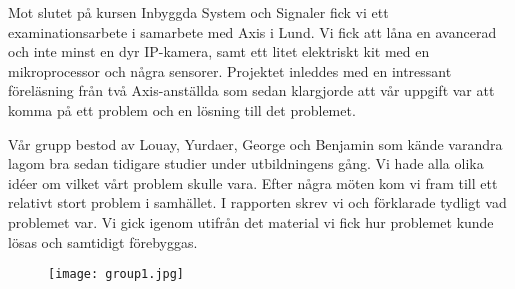 



\begin{abstracts}        %

Mot slutet på kursen Inbyggda System och Signaler fick vi ett examinationsarbete i samarbete med Axis i Lund. Vi fick att låna en avancerad och inte minst en dyr IP-kamera, samt ett litet elektriskt kit med en mikroprocessor och några sensorer. Projektet inleddes med en intressant föreläsning från två Axis-anställda som sedan klargjorde att vår uppgift var att komma på ett problem och en lösning till det problemet. 

Vår grupp bestod av Louay, Yurdaer, George och Benjamin som kände varandra lagom bra sedan tidigare studier under utbildningens gång. Vi hade alla olika idéer om vilket vårt problem skulle vara. Efter några möten kom vi fram till ett relativt stort problem i samhället. I rapporten skrev vi och förklarade tydligt vad problemet var. Vi gick igenom utifrån det material vi fick hur problemet kunde lösas och samtidigt förebyggas. 


\begin{figure}
  \texttt{[image: group1.jpg]}
  
  \label{fig:group1}
\end{figure}


\end{abstracts}


